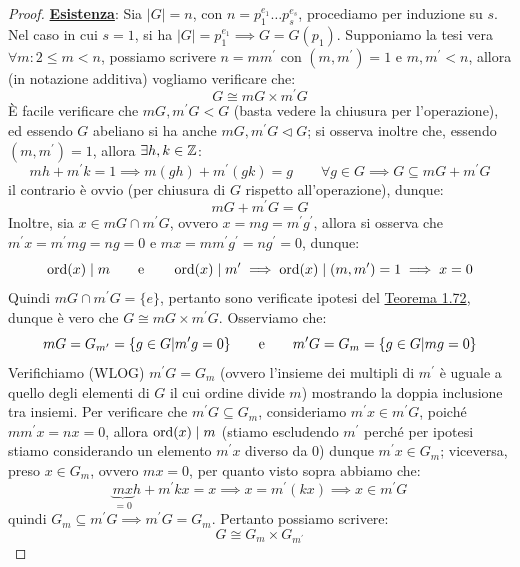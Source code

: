 \documentclass[11pt]{scrartcl}
\begin{document}
\begin{proof}
    \underline{\textbf{Esistenza}}: Sia $|G| = n$, con $n = p_1^{e_1} \ldots p_s^{e_s}$, procediamo per induzione su $s$. Nel caso in cui $s = 1$, si ha $|G| = p_1^{e_1} \implies G = G(p_1)$. Supponiamo 
    la tesi vera $\forall m : 2 \leq m < n$, possiamo scrivere $n = m m^{\prime}$ con $(m,m^{\prime}) = 1$ e $m,m^{\prime} < n$, allora (in notazione additiva) vogliamo verificare che:
        \[ G \cong mG \times m^{\prime}G
            \]
        È facile verificare che $mG,m^{\prime}G < G$ (basta vedere la chiusura per l'operazione), ed essendo $G$ abeliano si ha anche $mG,m^{\prime}G \triangleleft G$; si osserva inoltre che, essendo $(m,m^{\prime}) = 1$, allora $\exists h,k \in \mathbb Z$:
            \[ mh + m^{\prime}k = 1 \implies m(gh) + m^{\prime}(gk) = g \qquad \forall g \in G \implies G \subseteq mG + m^{\prime}G
                \]
        il contrario è ovvio (per chiusura di $G$ rispetto all'operazione), dunque:
            \[ mG + m^{\prime}G = G
                \]
        Inoltre, sia $x \in mG \cap m^{\prime}G$, ovvero $x = mg = m^{\prime}g^{\prime}$, allora si osserva che $m^{\prime}x = m^{\prime}mg = ng = 0$ e $mx = mm^{\prime}g^{\prime} = ng^{\prime} = 0$, dunque:
            \[ \operatorname{ord}(x) \mid m \qquad \text e \qquad \operatorname{ord}(x) \mid m^{\prime} \implies \operatorname{ord}(x) \mid (m,m^{\prime}) = 1 \implies x = 0
                \]
        Quindi $mG \cap m^{\prime}G = \{e\}$, pertanto sono verificate ipotesi del \hyperref[t:1.72]{Teorema 1.72}, dunque è vero che $G \cong mG \times m^{\prime}G$. Osserviamo che:
            \[ mG = G_{m^{\prime}} = \{g \in G | m^{\prime}g = 0\} \qquad \text e \qquad m^{\prime}G = G_m = \{g \in G | mg = 0\}
                \]
        Verifichiamo (WLOG) $m^{\prime}G = G_m$ (ovvero l'insieme dei multipli di $m^{\prime}$ è uguale a quello degli elementi di $G$ il cui ordine divide $m$) mostrando la doppia inclusione tra insiemi.
        Per verificare che $m^{\prime}G \subseteq G_m$, consideriamo $m^{\prime}x \in m^{\prime}G$, poiché $mm^{\prime}x = nx = 0$, allora $\operatorname{ord}(x) \mid m$ (stiamo escludendo $m^{\prime}$ perché per ipotesi
        stiamo considerando un elemento $m^{\prime}x$ diverso da 0) dunque $m^{\prime}x \in G_m$; viceversa, preso $x \in G_m$, ovvero $mx = 0$, per quanto visto sopra abbiamo che:
            \[ \underbrace{mx}_{= 0}h + m^{\prime}kx = x \implies x = m^{\prime}(kx) \implies x \in m^{\prime}G
                \]
        quindi $G_m \subseteq m^{\prime}G \implies m^{\prime}G = G_m$. Pertanto possiamo scrivere:
            \[ G \cong G_m \times G_{m^\prime}
\]
\end{proof}
\end{document}
